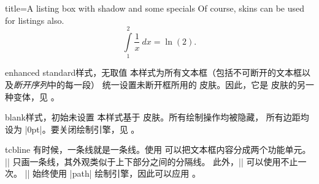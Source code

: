 \begin{dispExample}

\begin{tcblisting}{title=A listing box with shadow and some specials}
Of course, skins can be used for listings also.
\begin{equation}
  \int\limits_1^2 \frac{1}{x}~dx = \ln(2).
\end{equation}
\end{tcblisting}
\end{dispExample}


\clearpage


\begin{docTcbKey}{enhanced standard}{}{样式，无取值}
  本样式为所有文本框（包括不可断开的文本框以及\emph{断开序列}中的每一段）
  统一设置未断开框所用的  皮肤。因此，它是
   皮肤的另一种变体，见 。
\end{docTcbKey}


\begin{docTcbKey}{blank}{}{样式，初始未设置}
  本样式基于  皮肤。所有绘制操作均被隐藏，
  所有边距均设为 |0pt|。要关闭绘制引擎，见 。
\begin{dispExample}
\begin{tcolorbox}[blank,watermark text=A blank box]
\lipsum[1]
\end{tcolorbox}
\end{dispExample}
\end{docTcbKey}

\clearpage
\begin{docCommand}{tcbline}{}
  有时候，一条线就是一条线。使用  可以把文本框内容分成两个功能单元。
  |\tcbline| 只画一条线，其外观类似于上下部分之间的分隔线。
  此外，|\tcbline| 可以使用不止一次。
  |\tcbline| 始终使用 |path| 绘制引擎，因此可以应用 。

\begin{dispExample}

\begin{tcolorbox}[colupper=red!50!black,collower=green!50!black]
\lipsum[1]
\tcbline
\lipsum[2]
\tcblower
\lipsum[3]
\tcbline
\lipsum[4]
\end{tcolorbox}
\end{dispExample}
\end{docCommand}

